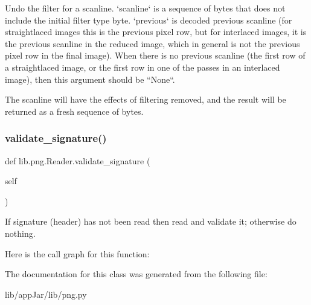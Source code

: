 \begin{DoxyVerb}Undo the filter for a scanline.  `scanline` is a sequence of
bytes that does not include the initial filter type byte.
`previous` is decoded previous scanline (for straightlaced
images this is the previous pixel row, but for interlaced
images, it is the previous scanline in the reduced image, which
in general is not the previous pixel row in the final image).
When there is no previous scanline (the first row of a
straightlaced image, or the first row in one of the passes in an
interlaced image), then this argument should be ``None``.

The scanline will have the effects of filtering removed, and the
result will be returned as a fresh sequence of bytes.
\end{DoxyVerb}
 \mbox{\label{classlib_1_1png_1_1_reader_a7b26c3bd2f93d45ee288aee22b4ecfff}} 
\subsubsection{\texorpdfstring{validate\+\_\+signature()}{validate\_signature()}}
{\footnotesize\ttfamily def lib.\+png.\+Reader.\+validate\+\_\+signature (\begin{DoxyParamCaption}\item[{}]{self }\end{DoxyParamCaption})}

\begin{DoxyVerb}If signature (header) has not been read then read and
validate it; otherwise do nothing.
\end{DoxyVerb}
 Here is the call graph for this function\+:


The documentation for this class was generated from the following file\+:\begin{DoxyCompactItemize}
\item 
lib/app\+Jar/lib/png.\+py\end{DoxyCompactItemize}
